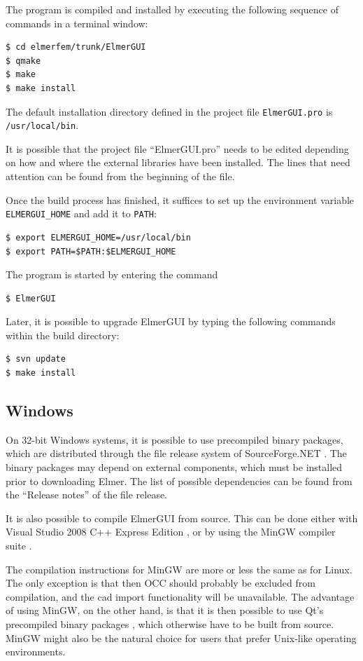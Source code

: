 \documentclass[a4paper,12pt]{article}
\begin{document}
The program is compiled and installed by executing the following sequence of commands in a terminal window:
\begin{verbatim}
$ cd elmerfem/trunk/ElmerGUI
$ qmake
$ make
$ make install
\end{verbatim}
The default installation directory defined in the project file {\tt ElmerGUI.pro} is
{\tt /usr/local/bin}.

It is possible that the project file ``ElmerGUI.pro'' needs to be edited depending on how and
where the external libraries have been installed. The lines that need attention can be found from
the beginning of the file.

Once the build process has finished, it suffices to set up the environment variable {\tt ELMERGUI\_HOME}
and add it to {\tt PATH}:
\begin{verbatim}
$ export ELMERGUI_HOME=/usr/local/bin
$ export PATH=$PATH:$ELMERGUI_HOME
\end{verbatim}
The program is started by entering the command
\begin{verbatim}
$ ElmerGUI
\end{verbatim}

Later, it is possible to upgrade ElmerGUI by typing the following commands within the build directory:
\begin{verbatim}
$ svn update
$ make install
\end{verbatim}

\subsection{Windows}

On 32-bit Windows systems, it is possible to use precompiled binary packages, which are distributed
through the file release system of SourceForge.NET \cite{ElmerfemHome}. The binary packages may depend
on external components, which must be installed prior to downloading Elmer. The list of possible
dependencies can be found from the ``Release notes'' of the file release.

It is also possible to compile ElmerGUI from source. This can be done either with Visual Studio
2008 C++ Express Edition \cite{VCEE2008Home}, or by using the MinGW compiler suite \cite{MinGWHome}.

The compilation instructions for MinGW are more or less the same as for Linux. The only exception
is that then OCC should probably be excluded from compilation, and the cad import functionality will
be unavailable. The advantage of using MinGW, on the other hand, is that it is then possible to use
Qt's precompiled binary packages \cite{QtHome}, which otherwise have to be built from source. MinGW
might also be the natural choice for users that prefer Unix-like operating environments.
\end{document}

